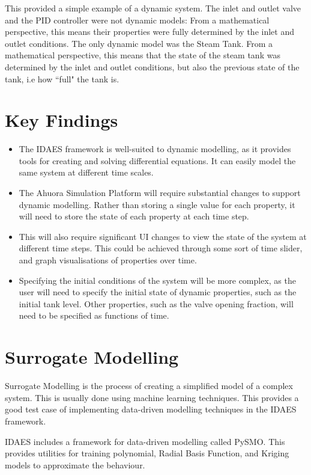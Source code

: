 \documentclass[12pt]{report}
\begin{document}
This provided a simple example of a dynamic system. The inlet and outlet valve and the PID controller were not dynamic models: From a mathematical perspective, this means their properties were fully determined by the inlet and outlet conditions. The only dynamic model was the Steam Tank. From a mathematical perspective, this means that the state of the steam tank was determined by the inlet and outlet conditions, but also the previous state of the tank, i.e how ``full" the tank is.


\section{Key Findings}\label{sec:dynamicmodelling}

\begin{itemize}
    \item The IDAES framework is well-suited to dynamic modelling, as it provides tools for creating and solving differential equations. It can easily model the same system at different time scales.
    \item The Ahuora Simulation Platform will require substantial changes to support dynamic modelling. Rather than storing a single value for each property, it will need to store the state of each property at each time step.
    \item This will also require significant UI changes to view the state of the system at different time steps. This could be achieved through some sort of time slider, and graph visualisations of properties over time.
    \item Specifying the initial conditions of the system will be more complex, as the user will need to specify the initial state of dynamic properties, such as the initial tank level. Other properties, such as the valve opening fraction, will need to be specified as functions of time.
\end{itemize}

\section{Surrogate Modelling}
Surrogate Modelling is the process of creating a simplified model of a complex system. This is usually done using machine learning techniques. This provides a good test case of implementing data-driven modelling techniques in the IDAES framework.

IDAES includes a framework for data-driven modelling called PySMO. This provides utilities for training polynomial, Radial Basis Function, and Kriging models to approximate the behaviour.
\end{document}
